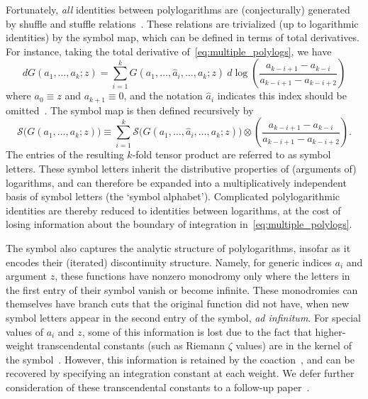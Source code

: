 \documentclass[12pt]{article}
\begin{document}
Fortunately, \emph{all} identities between polylogarithms are (conjecturally) generated by shuffle and stuffle relations~\cite{2011arXiv1102.1312B,2015arXiv151206409B}. These relations are trivialized (up to logarithmic identities) by the symbol map, which can be defined in terms of total derivatives. For instance, taking the total derivative of~\eqref{eq:multiple_polylogs}, we have
\begin{equation} \label{eq:symbol_def}
d G(a_1, \dots, a_k; z) = \sum_{i=1}^{k} G(a_1,\dots,\hat{a}_i,\dots,a_k; z)\ d\log \left( \frac{a_{k-i+1} - a_{k-i}}{a_{k-i+1} - a_{k-i+2}} \right)
\end{equation} 
where $a_0 \equiv z$ and $a_{k+1} \equiv 0$, and the notation $\hat{a}_i$ indicates this index should be omitted~\cite{GoncharovMixedTate}. The symbol map is then defined recursively by~\cite{Goncharov:2010jf}
\begin{equation} \label{eq:symbol_def}
\mathcal{S}\big(G(a_1, \dots, a_k; z)\big) \equiv \sum_{i=1}^{k} \mathcal{S}\big(G(a_1,\dots,\hat{a}_i,\dots,a_k; z) \big) \otimes \left( \frac{a_{k-i+1} - a_{k-i}}{a_{k-i+1} - a_{k-i+2}} \right).
\end{equation} 
The entries of the resulting $k$-fold tensor product are referred to as symbol letters. These symbol letters inherit the distributive properties of (arguments of) logarithms, and can therefore be expanded into a multiplicatively independent basis of symbol letters (the `symbol alphabet'). Complicated polylogarithmic identities are thereby reduced to identities between logarithms, at the cost of losing information about the boundary of integration in~\eqref{eq:multiple_polylogs}.
 
The symbol also captures the analytic structure of polylogarithms, insofar as it encodes their (iterated) discontinuity structure. Namely, for generic indices $a_i$ and argument $z$, these functions have nonzero monodromy only where the letters in the first entry of their symbol vanish or become infinite. These monodromies can themselves have branch cuts that the original function did not have, when new symbol letters appear in the second entry of the symbol, \emph{ad infinitum}. For special values of $a_i$ and $z$, some of this information is lost due to the fact that higher-weight transcendental constants (such as Riemann $\zeta$ values) are in the kernel of the symbol~\cite{Gonch}. However, this information is retained by the coaction~\cite{Brown:2011ik,Duhr:2012fh}, and can be recovered by specifying an integration constant at each weight. We defer further consideration of these transcendental constants to a follow-up paper~\cite{cluster_subalgebras_ii}.
\end{document}
